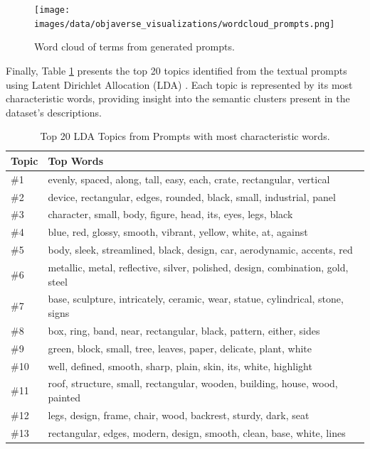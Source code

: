\begin{figure}[h]
  \centering
  \texttt{[image: images/data/objaverse\_visualizations/wordcloud\_prompts.png]}
  \caption{Word cloud of terms from generated prompts.}
  \label{fig:wordcloud-prompts}
\end{figure}

Finally, Table \ref{tab:lda-topics} presents the top 20 topics identified from the textual prompts using Latent Dirichlet Allocation (LDA) \cite{lda}. Each topic is represented by its most characteristic words, providing insight into the semantic clusters present in the dataset's descriptions.

\begin{table}[h]
  \centering
  \caption{Top 20 LDA Topics from Prompts with most characteristic words.}
  \label{tab:lda-topics}
  \begin{tabular}{ll}
    \toprule
    \textbf{Topic} & \textbf{Top Words} \\
    \midrule
    \#1 & evenly, spaced, along, tall, easy, each, crate, rectangular, vertical \\
    \#2 & device, rectangular, edges, rounded, black, small, industrial, panel \\
    \#3 & character, small, body, figure, head, its, eyes, legs, black \\
    \#4 & blue, red, glossy, smooth, vibrant, yellow, white, at, against \\
    \#5 & body, sleek, streamlined, black, design, car, aerodynamic, accents, red \\
    \#6 & metallic, metal, reflective, silver, polished, design, combination, gold, steel \\
    \#7 & base, sculpture, intricately, ceramic, wear, statue, cylindrical, stone, signs \\
    \#8 & box, ring, band, near, rectangular, black, pattern, either, sides \\
    \#9 & green, block, small, tree, leaves, paper, delicate, plant, white \\
    \#10 & well, defined, smooth, sharp, plain, skin, its, white, highlight \\
    \#11 & roof, structure, small, rectangular, wooden, building, house, wood, painted \\
    \#12 & legs, design, frame, chair, wood, backrest, sturdy, dark, seat \\
    \#13 & rectangular, edges, modern, design, smooth, clean, base, white, lines \\

\end{tabular}
\end{table}
